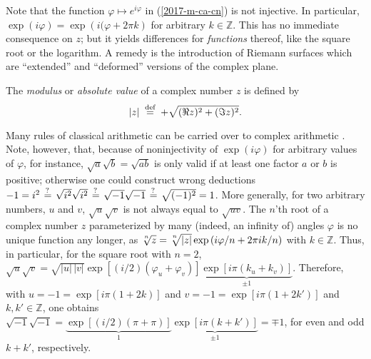 Note that the function $\varphi \mapsto e^{i\varphi}$ in (\ref{2017-m-ca-cn}) is not injective. In particular,
$\exp ({i\varphi})= \exp ( {i(\varphi} + 2\pi  k)$ for arbitrary $k \in \mathbb{Z}$.
This has no immediate consequence on $z$;
but it yields differences for {\em functions} thereof, like the square root or the logarithm.
A remedy is the introduction of Riemann surfaces which are ``extended'' and ``deformed'' versions of the complex plane.

The {\em modulus} or {\em absolute value}
of a complex number $z$ is defined by
\begin{equation}
| z |
\stackrel{{\tiny \textrm{ def }}}{=} +
\sqrt{ (\Re z)^2 + (\Im z)^2 }.
\label{2012-m-ch-ca-defmodulus}
\end{equation}

Many rules of classical arithmetic can be carried over to complex arithmetic
\cite{apostol,freitag-busam}.
Note, however,
that, because of noninjectivity of $\exp ( i\varphi)$ for arbitrary values of $\varphi$,
for instance, $\sqrt{a}\sqrt{b}= \sqrt{ab}$
is only valid if at least one factor $a$ or $b$ is positive;
otherwise one could construct wrong deductions $-1=i^2 \stackrel{{\tiny \textrm{ ? }}}{=} \sqrt{i^2}\sqrt{i^2} \stackrel{{\tiny \textrm{ ? }}}{=} \sqrt{-1}\sqrt{-1} \stackrel{{\tiny \textrm{ ? }}}{=} \sqrt{(-1)^2}=1$.
More generally, for two arbitrary numbers, $u$ and $v$,
$\sqrt{u}\sqrt{v}$ is not always equal to $\sqrt{u v}$.
The $n$'th root of a complex number $z$ parameterized by many (indeed, an infinity of) angles $\varphi$ is no unique function any longer,
as $\sqrt[\leftroot{0}\uproot{3}n]{z} = \sqrt[\leftroot{0}\uproot{3}n]{\vert z\vert } \exp \left(i\varphi / n + 2\pi i k/n\right)$
with $k \in \mathbb{Z}$.
Thus, in particular, for the square root with $n=2$,
$\sqrt{u}\sqrt{v}= \sqrt{|u|\,|v|}
\exp \left[ (i/2)(\varphi_u   +\varphi_v )
\right]
\underbrace{\exp \left[i \pi (k_u + k_v)\right]}_{\pm 1}
$.
Therefore, with $u={-1} = \exp [i\pi (1 +2 k)]$ and
$v={-1} = \exp [i\pi (1 +2 k')]$ and $k,k' \in \mathbb{Z}$, one obtains
$
\sqrt{-1}\sqrt{-1}=
\underbrace{\exp \left[ (i/2)(\pi   +\pi )\right]}_{1}
\underbrace{\exp \left[i \pi (k  + k')\right]}_{\pm 1}
=\mp 1
$,
for even and odd $k + k'$, respectively.

